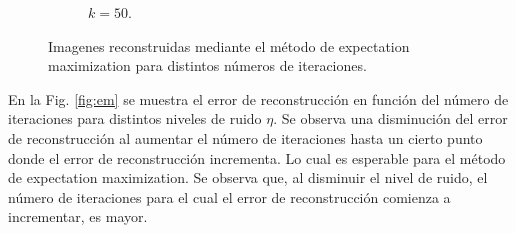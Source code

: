 \documentclass[letterpaper,12pt]{article}
\theoremstyle{plain}
\begin{document}
\begin{figure}[H]
\begin{subfigure}[h]{0.32\linewidth}
      \caption{$k=50$.}
      \label{fig:k50}
        \end{subfigure}
   \caption{Imagenes reconstruidas mediante el método de expectation maximization para distintos números de iteraciones.}
   \label{fig:em_iter}
\end{figure}

En la Fig. \ref{fig:em} se muestra el error de reconstrucción en función del número de iteraciones para distintos niveles de ruido $\eta$. Se observa una disminución del error de reconstrucción al aumentar el número de iteraciones hasta un cierto punto donde el error de reconstrucción incrementa. Lo cual es esperable para el método de expectation maximization. Se observa que, al disminuir el nivel de ruido, el número de iteraciones para el cual el error de reconstrucción comienza a incrementar, es mayor. 
\end{document}
